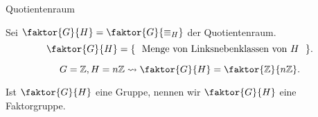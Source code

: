 \documentclass[class=article, crop=false]{standalone}
\begin{document}
\begin{zettel}{Quotientenraum}
\begin{flashcard}
    Sei $\faktor{G}{H} = \faktor{G}{\equiv_H}$ der Quotientenraum.
    \[
        \faktor{G}{H} = \set{\tx{ Menge von Linksnebenklassen von $H$ } }
    .\]
\end{flashcard}

\begin{example}
    \[
        G = \mathbb{Z}, H =  n \mathbb{Z} \rightsquigarrow \faktor{G}{H} =  \faktor{\mathbb{Z}}{n \mathbb{Z}}
    .\]
\end{example}

Ist $\faktor{G}{H}$ eine Gruppe, nennen wir $\faktor{G}{H}$ eine Faktorgruppe.

\end{zettel}
\end{document}
